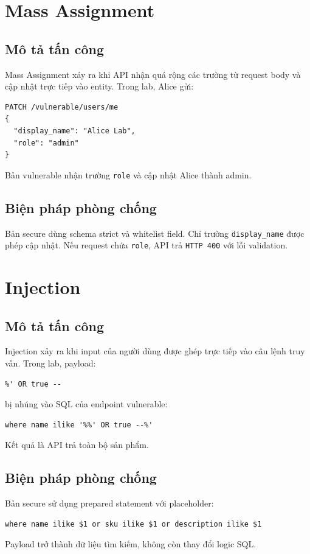 \documentclass[14pt,a4paper]{extreport}
\begin{document}
\section{Mass Assignment}
\subsection{Mô tả tấn công}
Mass Assignment xảy ra khi API nhận quá rộng các trường từ request body và cập nhật trực tiếp vào entity. Trong lab, Alice gửi:
\begin{lstlisting}
PATCH /vulnerable/users/me
{
  "display_name": "Alice Lab",
  "role": "admin"
}
\end{lstlisting}
Bản vulnerable nhận trường \texttt{role} và cập nhật Alice thành admin.

\subsection{Biện pháp phòng chống}
Bản secure dùng schema strict và whitelist field. Chỉ trường \texttt{display\_name} được phép cập nhật. Nếu request chứa \texttt{role}, API trả \texttt{HTTP 400} với lỗi validation.

\section{Injection}
\subsection{Mô tả tấn công}
Injection xảy ra khi input của người dùng được ghép trực tiếp vào câu lệnh truy vấn. Trong lab, payload:
\begin{lstlisting}
%' OR true --
\end{lstlisting}
bị nhúng vào SQL của endpoint vulnerable:
\begin{lstlisting}
where name ilike '%%' OR true --%'
\end{lstlisting}
Kết quả là API trả toàn bộ sản phẩm.

\subsection{Biện pháp phòng chống}
Bản secure sử dụng prepared statement với placeholder:
\begin{lstlisting}
where name ilike $1 or sku ilike $1 or description ilike $1
\end{lstlisting}
Payload trở thành dữ liệu tìm kiếm, không còn thay đổi logic SQL.
\end{document}
